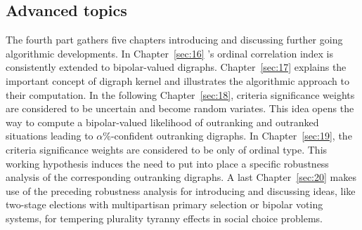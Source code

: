 % 
%
%

\begin{partbacktext}
\part{Advanced topics}
\noindent The fourth part gathers five chapters introducing and discussing further going algorithmic developments. In Chapter~\vref{sec:16} \Kendall's ordinal correlation index is consistently extended to bipolar-valued digraphs. Chapter~\vref{sec:17} explains the important concept of digraph kernel and illustrates the \Digraph algorithmic approach to their computation. In the following Chapter~\vref{sec:18}, criteria significance weights are considered to be uncertain and become random variates. This idea opens the way to compute a bipolar-valued likelihood of outranking and outranked situations leading to $\alpha\%$-confident outranking digraphs. In Chapter~\vref{sec:19}, the criteria significance weights are considered to be only of ordinal type. This working hypothesis induces the need to put into place a specific robustness analysis of the corresponding outranking digraphs. A last Chapter~\vref{sec:20} makes use of the preceding robustness analysis for introducing and discussing ideas, like two-stage elections with multipartisan primary selection or bipolar voting systems, for tempering plurality tyranny effects in social choice problems.
\end{partbacktext}